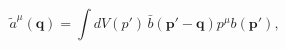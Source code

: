 \begin{equation}
\tilde{a}^\mu({\mathbf{q}}) = \int dV(p')
\,\bar{b}({\mathbf{p' - q}}) p^\mu b ({\mathbf{p'}}), \label{4-5}
\end{equation}

